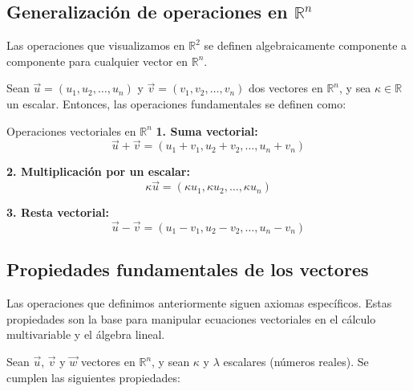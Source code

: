 \subsection{Generalización de operaciones en $\mathbb{R}^n$}

Las operaciones que visualizamos en $\mathbb{R}^2$ se definen algebraicamente componente a componente para cualquier vector en $\mathbb{R}^n$.

Sean $\vec{u} = (u_1, u_2, \dots, u_n)$ y $\vec{v} = (v_1, v_2, \dots, v_n)$ dos vectores en $\mathbb{R}^n$, y sea $\kappa \in \mathbb{R}$ un escalar. Entonces, las operaciones fundamentales se definen como:

\begin{mydefinition}{Operaciones vectoriales en $\mathbb{R}^n$}
\textbf{1. Suma vectorial:}
\[\vec{u} + \vec{v} = (u_1 + v_1, u_2 + v_2, \dots, u_n + v_n)\]

\textbf{2. Multiplicación por un escalar:}
\[\kappa\vec{u} = (\kappa u_1, \kappa u_2, \dots, \kappa u_n)\]

\textbf{3. Resta vectorial:}
\[\vec{u} - \vec{v} = (u_1 - v_1, u_2 - v_2, \dots, u_n - v_n)\]
\end{mydefinition}

\subsection{Propiedades fundamentales de los vectores}

Las operaciones que definimos anteriormente siguen axiomas específicos. Estas propiedades son la base para manipular ecuaciones vectoriales en el cálculo multivariable y el álgebra lineal.

Sean $\vec{u}$, $\vec{v}$ y $\vec{w}$ vectores en $\mathbb{R}^n$, y sean $\kappa$ y $\lambda$ escalares (números reales). Se cumplen las siguientes propiedades:

